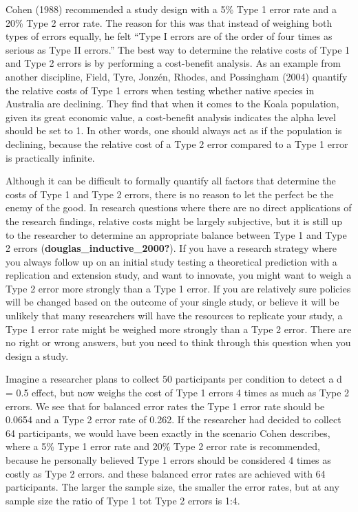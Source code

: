 \documentclass[
  english,
  ,jou, a4paper,floatsintext]{apa6}
\begin{document}
Cohen (1988) recommended a study design with a 5\% Type 1 error rate and a 20\% Type 2 error rate. The reason for this was that instead of weighing both types of errors equally, he felt ``Type I errors are of the order of four times as serious as Type II errors.'' The best way to determine the relative costs of Type 1 and Type 2 errors is by performing a cost-benefit analysis. As an example from another discipline, Field, Tyre, Jonzén, Rhodes, and Possingham (2004) quantify the relative costs of Type 1 errors when testing whether native species in Australia are declining. They find that when it comes to the Koala population, given its great economic value, a cost-benefit analysis indicates the alpha level should be set to 1. In other words, one should always act as if the population is declining, because the relative cost of a Type 2 error compared to a Type 1 error is practically infinite.

Although it can be difficult to formally quantify all factors that determine the costs of Type 1 and Type 2 errors, there is no reason to let the perfect be the enemy of the good. In research questions where there are no direct applications of the research findings, relative costs might be largely subjective, but it is still up to the researcher to determine an appropriate balance between Type 1 and Type 2 errors (\textbf{douglas\_inductive\_2000?}). If you have a research strategy where you always follow up on an initial study testing a theoretical prediction with a replication and extension study, and want to innovate, you might want to weigh a Type 2 error more strongly than a Type 1 error. If you are relatively sure policies will be changed based on the outcome of your single study, or believe it will be unlikely that many researchers will have the resources to replicate your study, a Type 1 error rate might be weighed more strongly than a Type 2 error. There are no right or wrong answers, but you need to think through this question when you design a study.

Imagine a researcher plans to collect 50 participants per condition to detect a d = 0.5 effect, but now weighs the cost of Type 1 errors 4 times as much as Type 2 errors. We see that for balanced error rates the Type 1 error rate should be 0.0654 and a Type 2 error rate of 0.262. If the researcher had decided to collect 64 participants, we would have been exactly in the scenario Cohen describes, where a 5\% Type 1 error rate and 20\% Type 2 error rate is recommended, because he personally believed Type 1 errors should be considered 4 times as costly as Type 2 errors. and these balanced error rates are achieved with 64 participants. The larger the sample size, the smaller the error rates, but at any sample size the ratio of Type 1 tot Type 2 errors is 1:4.
\end{document}
